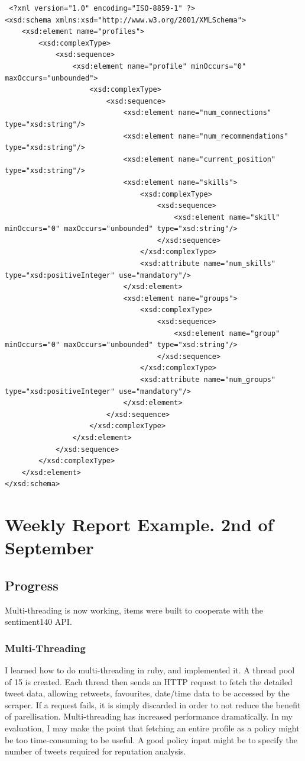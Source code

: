 \begin{verbatim}
 <?xml version="1.0" encoding="ISO-8859-1" ?>
<xsd:schema xmlns:xsd="http://www.w3.org/2001/XMLSchema">
	<xsd:element name="profiles">
		<xsd:complexType>
			<xsd:sequence>
				<xsd:element name="profile" minOccurs="0" maxOccurs="unbounded">
					<xsd:complexType>
						<xsd:sequence>
							<xsd:element name="num_connections" type="xsd:string"/>
							<xsd:element name="num_recommendations" type="xsd:string"/>
							<xsd:element name="current_position" type="xsd:string"/>
							<xsd:element name="skills">
								<xsd:complexType>
									<xsd:sequence>
										<xsd:element name="skill" minOccurs="0" maxOccurs="unbounded" type="xsd:string"/>
									</xsd:sequence>
								</xsd:complexType>
								<xsd:attribute name="num_skills" type="xsd:positiveInteger" use="mandatory"/>
							</xsd:element>
							<xsd:element name="groups">
								<xsd:complexType>
									<xsd:sequence>
										<xsd:element name="group" minOccurs="0" maxOccurs="unbounded" type="xsd:string"/>
									</xsd:sequence>
								</xsd:complexType>
								<xsd:attribute name="num_groups" type="xsd:positiveInteger" use="mandatory"/>
							</xsd:element>
						</xsd:sequence>
					</xsd:complexType>
				</xsd:element>
			</xsd:sequence>
		</xsd:complexType>
	</xsd:element>
</xsd:schema>
\end{verbatim}


\chapter{Weekly Report Example. 2nd of September}\label{C:us}

\section{Progress}

Multi-threading is now working, items were built to cooperate with the sentiment140 API.

\subsection{Multi-Threading} I learned how to do multi-threading in ruby, and implemented it. A thread pool of 15 is created. Each thread then sends an HTTP request to fetch the detailed tweet data, allowing retweets, favourites, date/time data to be accessed by the scraper. If a request fails, it is simply discarded in order to not reduce the benefit of parellisation. Multi-threading has increased performance dramatically. In my evaluation, I may make the point that fetching an entire profile as a policy might be too time-consuming to be useful. A good policy input might be to specify the number of tweets required for reputation analysis. 

